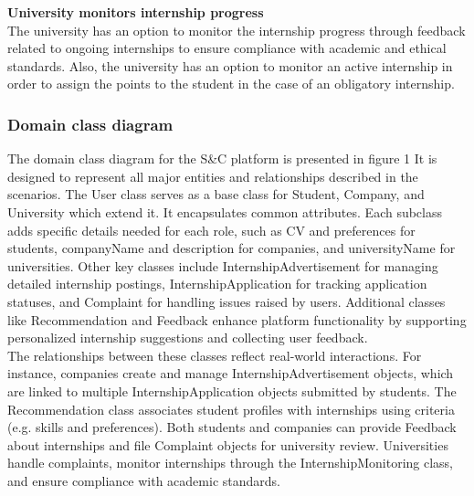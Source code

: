 \textbf{University monitors internship progress}\\
The university has an option to monitor the internship progress through feedback related to ongoing internships to ensure compliance with academic and ethical standards. Also, the university has an option to monitor an active internship in order to assign the points to the student in the case of an obligatory internship. \\




\subsubsection{Domain class diagram}

\quad The domain class diagram for the S\&C platform is presented in figure 1 It is designed to represent all major entities and relationships described in the scenarios. The User class serves as a base class for Student, Company, and University which extend it. It encapsulates common attributes. Each subclass adds specific details needed for each role, such as CV and preferences for students, companyName and description for companies, and universityName for universities. Other key classes include InternshipAdvertisement for managing detailed internship postings, InternshipApplication for tracking application statuses, and Complaint for handling issues raised by users. Additional classes like Recommendation and Feedback enhance platform functionality by supporting personalized internship suggestions and collecting user feedback. \\

The relationships between these classes reflect real-world interactions. For instance, companies create and manage InternshipAdvertisement objects, which are linked to multiple InternshipApplication objects submitted by students. The Recommendation class associates student profiles with internships using criteria (e.g. skills and preferences). Both students and companies can provide Feedback about internships and file Complaint objects for university review. Universities handle complaints, monitor internships through the InternshipMonitoring class, and ensure compliance with academic standards.

